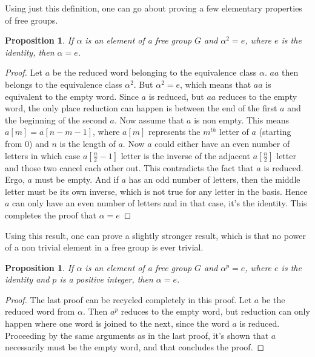 \documentclass[12pt, titlepage]{article}
\newtheorem{prop}[thm]{Proposition}
\theoremstyle{definition}
\begin{document}
Using just this definition, one can go about proving a few elementary properties of free groups.

\begin{prop}\label{double}
If $\alpha$ is an element of a free group $G$ and $\alpha^2=e$, where $e$ is the identity, then $\alpha=e$.
\end{prop}

\begin{proof}
Let $a$ be the reduced word belonging to the equivalence class $\alpha$. $aa$ then belongs to the equivalence class $\alpha^2$. But $\alpha^2=e$, which means that $aa$ is equivalent to the empty word. Since $a$ is reduced, but $aa$ reduces to the empty word, the only place reduction can happen is between the end of the first $a$ and the beginning of the second $a$. Now assume that $a$ is non empty. This means $a[m] = a[n-m-1]$, where $a[m]$ represents the $m^{th}$ letter of $a$ (starting from $0$) and $n$ is the length of $a$. Now $a$ could either have an even number of letters in which case $a\left[\frac{n}{2} -1\right]$ letter is the inverse of the adjacent $a\left[\frac{n}{2}\right]$ letter and those two cancel each other out. This contradicts the fact that $a$ is reduced. Ergo, $a$ must be empty. And if $a$ has an odd number of letters, then the middle letter must be its own inverse, which is not true for any letter in the basis. Hence $a$ can only have an even number of letters and in that case, it's the identity. This completes the proof that $\alpha=e$
\end{proof}

Using this result, one can prove a slightly stronger result, which is that no power of a non trivial element in a free group is ever trivial.

\begin{prop}
If $\alpha$ is an element of a free group $G$ and $\alpha^p=e$, where $e$ is the identity and $p$ is a positive integer, then $\alpha=e$.
\end{prop}

\begin{proof}
The last proof can be recycled completely in this proof. Let $a$ be the reduced word from $\alpha$. Then $a^p$ reduces to the empty word, but reduction can only happen where one word is joined to the next, since the word $a$ is reduced. Proceeding by the same arguments as in the last proof, it's shown that $a$ necessarily must be the empty word, and that concludes the proof. 
\end{proof}
\end{document}
